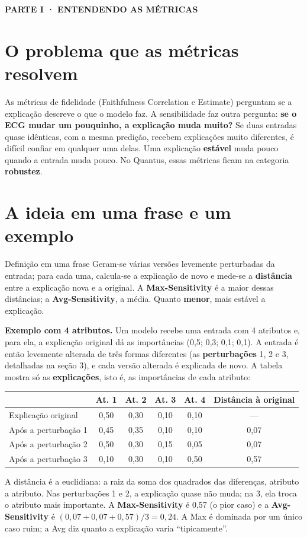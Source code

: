 \documentclass[11pt,a4paper]{article}
\newcommand{\partbar}[1]{\par\vspace{1.2em}\noindent\colorbox{black!80}{\parbox{\dimexpr\linewidth-2\fboxsep}{\color{white}\bfseries\sffamily\MakeUppercase{#1}}}\par\vspace{0.4em}}
\begin{document}
\partbar{Parte I · Entendendo as métricas}

\section{O problema que as métricas resolvem}
As métricas de fidelidade (Faithfulness Correlation e Estimate) perguntam se a explicação descreve o que o modelo faz. A sensibilidade faz outra pergunta: \textbf{se o ECG mudar um pouquinho, a explicação muda muito?} Se duas entradas quase idênticas, com a mesma predição, recebem explicações muito diferentes, é difícil confiar em qualquer uma delas. Uma explicação \textbf{estável} muda pouco quando a entrada muda pouco. No Quantus, essas métricas ficam na categoria \textbf{robustez}.

\section{A ideia em uma frase e um exemplo}
\begin{infobox}[note]{Definição em uma frase}
Geram-se várias versões levemente perturbadas da entrada; para cada uma, calcula-se a explicação de novo e mede-se a \textbf{distância} entre a explicação nova e a original. A \textbf{Max-Sensitivity} é a maior dessas distâncias; a \textbf{Avg-Sensitivity}, a média. Quanto \textbf{menor}, mais estável a explicação.
\end{infobox}

\textbf{Exemplo com 4 atributos.} Um modelo recebe uma entrada com 4 atributos e, para ela, a explicação original dá as importâncias (0,5; 0,3; 0,1; 0,1). A entrada é então levemente alterada de três formas diferentes (as \textbf{perturbações} 1, 2 e 3, detalhadas na seção 3), e cada versão alterada é explicada de novo. A tabela mostra só as \textbf{explicações}, isto é, as importâncias de cada atributo:
\begin{center}\small
\begin{tabular}{lccccc}
\toprule
& \textbf{At. 1} & \textbf{At. 2} & \textbf{At. 3} & \textbf{At. 4} & \textbf{Distância à original} \\
\midrule
Explicação original & 0,50 & 0,30 & 0,10 & 0,10 & --- \\
Após a perturbação 1 & 0,45 & 0,35 & 0,10 & 0,10 & 0,07 \\
Após a perturbação 2 & 0,50 & 0,30 & 0,15 & 0,05 & 0,07 \\
Após a perturbação 3 & 0,10 & 0,30 & 0,10 & 0,50 & 0,57 \\
\bottomrule
\end{tabular}
\end{center}
A distância é a euclidiana: a raiz da soma dos quadrados das diferenças, atributo a atributo. Nas perturbações 1 e 2, a explicação quase não muda; na 3, ela troca o atributo mais importante. A \textbf{Max-Sensitivity} é 0,57 (o pior caso) e a \textbf{Avg-Sensitivity} é $(0{,}07 + 0{,}07 + 0{,}57)/3 = 0{,}24$. A Max é dominada por um único caso ruim; a Avg diz quanto a explicação varia “tipicamente”.
\end{document}
